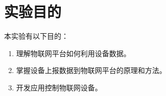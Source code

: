\section{实验目的}
本实验有以下目的：
\begin{enumerate}
    \item 理解物联网平台如何利用设备数据。
    \item 掌握设备上报数据到物联网平台的原理和方法。
    \item 开发应用控制物联网设备。
\end{enumerate}